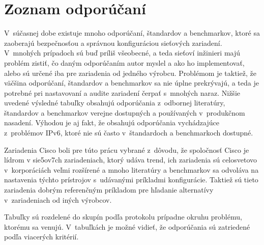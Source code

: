 \newpage
\section{Zoznam odporúčaní}

V~súčasnej dobe existuje mnoho odporúčaní, štandardov a benchmarkov, ktoré sa zaoberajú bezpečnosťou a správnou konfiguráciou sieťových zariadení. V~mnohých prípadoch sú buď príliš všeobecné, a teda sieťoví inžinieri majú problém zistiť, čo daným odporúčaním autor myslel a ako ho implementovať, alebo sú určené iba pre zariadenia od jedného výrobcu. Problémom je taktiež, že väčšina odporúčaní, štandardov a benchmarkov sa nie úplne prekrývajú, a teda je potrebné pri nastavovaní a audite zariadení čerpať s~mnohých naraz. Nižšie uvedené výsledné tabuľky obsahujú odporúčania z~odbornej literatúry, štandardov a benchmarkov verejne dostupných a používaných v~produkčnom nasadení. Výhodou je aj fakt, že obsahujú odporúčania vychádzajúce z~problémov IPv6, ktoré nie sú často v~štandardoch a benchmarkoch dostupné. 

Zariadenia Cisco boli pre túto prácu vybrané z~dôvodu, že spoločnosť Cisco je lídrom v sie5ov7ch zariadeniach, ktorý udáva trend, ich zariadenia sú celosvetovo v~korporáciách veľmi rozšírené a mnoho literatúry a benchmarkov sa odvoláva na nastavenia týchto prístrojov s~udávanými príkladmi konfigurácie. Taktiež sú tieto zariadenia dobrým referenčným príkladom pre hľadanie alternatívy v~zariadeniach od iných výrobcov.

Tabuľky sú rozdelené do skupín podľa protokolu prípadne okruhu problému, ktorému sa venujú. V~tabuľkách je možné vidieť, že odporúčania sú zatriedené podľa viacerých kritérií. %

